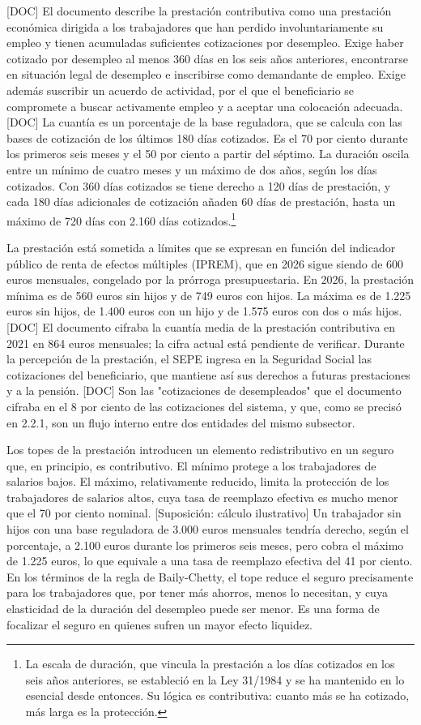 \documentclass[10pt,a4paper]{article}
\begin{document}
[DOC] El documento describe la prestación contributiva como una prestación económica dirigida a los trabajadores que han perdido involuntariamente su empleo y tienen acumuladas suficientes cotizaciones por desempleo. Exige haber cotizado por desempleo al menos 360 días en los seis años anteriores, encontrarse en situación legal de desempleo e inscribirse como demandante de empleo. Exige además suscribir un acuerdo de actividad, por el que el beneficiario se compromete a buscar activamente empleo y a aceptar una colocación adecuada. [DOC] La cuantía es un porcentaje de la base reguladora, que se calcula con las bases de cotización de los últimos 180 días cotizados. Es el 70 por ciento durante los primeros seis meses y el 50 por ciento a partir del séptimo. La duración oscila entre un mínimo de cuatro meses y un máximo de dos años, según los días cotizados. Con 360 días cotizados se tiene derecho a 120 días de prestación, y cada 180 días adicionales de cotización añaden 60 días de prestación, hasta un máximo de 720 días con 2.160 días cotizados.\footnote{%
    La escala de duración, que vincula la prestación a los días cotizados en los seis años anteriores, se estableció en la Ley 31/1984 y se ha mantenido en lo esencial desde entonces. Su lógica es contributiva: cuanto más se ha cotizado, más larga es la protección.
}


La prestación está sometida a límites que se expresan en función del indicador público de renta de efectos múltiples (IPREM), que en 2026 sigue siendo de 600 euros mensuales, congelado por la prórroga presupuestaria. En 2026, la prestación mínima es de 560 euros sin hijos y de 749 euros con hijos. La máxima es de 1.225 euros sin hijos, de 1.400 euros con un hijo y de 1.575 euros con dos o más hijos. [DOC] El documento cifraba la cuantía media de la prestación contributiva en 2021 en 864 euros mensuales; la cifra actual está pendiente de verificar. Durante la percepción de la prestación, el SEPE ingresa en la Seguridad Social las cotizaciones del beneficiario, que mantiene así sus derechos a futuras prestaciones y a la pensión. [DOC] Son las "cotizaciones de desempleados" que el documento cifraba en el 8 por ciento de las cotizaciones del sistema, y que, como se precisó en 2.2.1, son un flujo interno entre dos entidades del mismo subsector.

Los topes de la prestación introducen un elemento redistributivo en un seguro que, en principio, es contributivo. El mínimo protege a los trabajadores de salarios bajos. El máximo, relativamente reducido, limita la protección de los trabajadores de salarios altos, cuya tasa de reemplazo efectiva es mucho menor que el 70 por ciento nominal. [Suposición: cálculo ilustrativo] Un trabajador sin hijos con una base reguladora de 3.000 euros mensuales tendría derecho, según el porcentaje, a 2.100 euros durante los primeros seis meses, pero cobra el máximo de 1.225 euros, lo que equivale a una tasa de reemplazo efectiva del 41 por ciento. En los términos de la regla de Baily-Chetty, el tope reduce el seguro precisamente para los trabajadores que, por tener más ahorros, menos lo necesitan, y cuya elasticidad de la duración del desempleo puede ser menor. Es una forma de focalizar el seguro en quienes sufren un mayor efecto liquidez.
\end{document}

